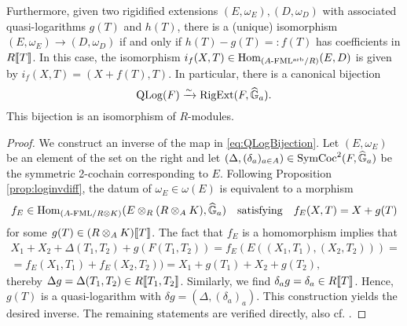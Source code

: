 \documentclass[../main.tex]{subfiles}
\begin{document}
\begin{thm}
Furthermore, given two rigidified extensions
$(E, \omega_E), (D, \omega_{D})$ with associated quasi-logarithms
$g(T)$ and $h(T)$, there is a (unique) isomorphism $(E, \omega_E) \to (D, \omega_{D})$
if and only if $h(T)-g(T) =: f(T)$ has coefficients in $R\llbracket T \rrbracket$. 
In this case, the isomorphism $i_f(X,T) \in \operatorname{Hom}_{{({A}\text-\allowbreak\mathrm{FML^{arb}}/{R})}}(E, D)$ is
given by $i_f(X,T) = (X+f(T), T)$. In particular, there is a canonical bijection
\begin{equation*}
  \operatorname {QLog}(F) \xrightarrow{\sim} \operatorname {RigExt}(F, \widehat{\mathbb{G}}_a).
\end{equation*}
This bijection is an isomorphism of $R$-modules.
\begin{proof}[Proof]
  We construct an inverse of the map in \eqref{eq:QLogBijection}. Let $(E,
  \omega_E)$ be an element of the set on the right
  and let $(\Delta, (\delta_a)_{a \in A}) \in
  \operatorname{SymCoc}^2(F, \widehat{\mathbb{G}}_a)$ be the symmetric 2-cochain corresponding to $E$.
  Following Proposition \ref{prop:loginvdiff}, the datum of 
  $\omega_E \in \omega(E)$ is equivalent to a morphism 
  $$f_E \in \operatorname{Hom}_{{({A}\text-\allowbreak\mathrm{FML}/{R \otimes K})}}(E \otimes_R (R \otimes_A K), \widehat{\mathbb{G}}_a)
  \quad \text{satisfying} \quad f_E(X,T) = X + g(T)$$
  for some $g(T) \in (R \otimes_A K)\llbracket T \rrbracket$. The fact that 
  $f_E$ is a homomorphism implies that 
  \begin{multline*}
    X_1 + X_2 + \Delta(T_1, T_2) + g(F(T_1,T_2)) = f_E(E((X_1, T_1), (X_2, T_2))) = \\
    = f_E(X_1, T_1) + f_E(X_2, T_2)) = X_1 + g(T_1) + X_2 + g(T_2),
  \end{multline*}
  thereby $\Delta g = \Delta(T_1, T_2) \in R\llbracket T_1, T_2\rrbracket$. Similarly, 
  we find $\delta_a g = \delta_a \in R\llbracket T \rrbracket$. Hence, $g(T)$ is a
  quasi-logarithm with $\delta g = (\Delta, (\delta_a)_a)$. 
  This construction yields the desired inverse.
  The remaining statements are verified directly, also cf. \cite[Section
  8]{hopkins1994equivariant}.
\end{proof}
\end{thm}
\end{document}
